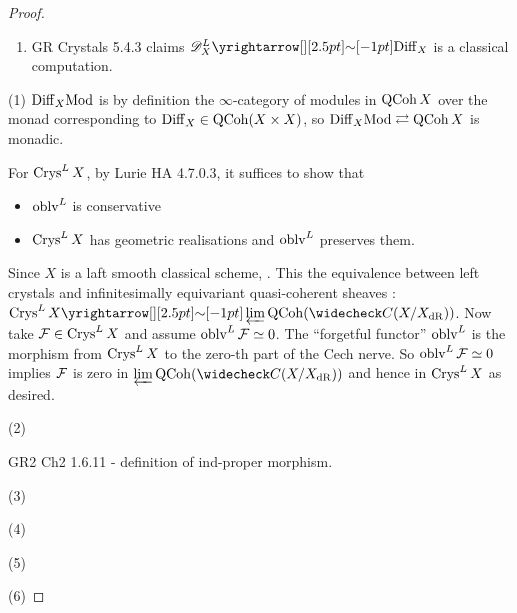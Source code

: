 \documentclass[./main.tex]{subfiles}
\begin{document}
\begin{proof}
\begin{enumerate}
    \item GR Crystals 5.4.3 claims $\s{D}^L_X \map{\sim}{} \DIFF_X$ 
    is a classical computation.

  \end{enumerate}

  (1) $\mathrm{Diff}_X\mathrm{Mod}$ is by definition the $\infty$-category of
  modules in $\mathrm{QCoh}\,X$ over the monad corresponding to 
  $\mathrm{Diff}_X \in \mathrm{QCoh}(X\times X)$,
  so $\mathrm{Diff}_X\mathrm{Mod} \rightleftarrows \mathrm{QCoh}\,X$ is monadic.
  
  For $\mathrm{Crys}^L\,X$,
  by Lurie HA 4.7.0.3, 
  it suffices to show that 
  \begin{itemize}
    \item $\mathrm{oblv}^L$ is conservative
    \item $\mathrm{Crys}^L\,X$ has geometric realisations and $\mathrm{oblv}^L$ preserves them.
  \end{itemize}


  Since $X$ is a laft smooth classical scheme,
  .
  This  the equivalence 
  between left crystals and infinitesimally equivariant quasi-coherent sheaves :
  $\CRYS^L\,X \map{\sim}{} \LIM \QCOH(\check{C}(X / X_\DR))$.
  Now take $\mathcal{F} \in \mathrm{Crys}^L\,X$ and assume $\mathrm{oblv}^L\,\mathcal{F} \simeq 0$.
  The ``forgetful functor'' $\mathrm{oblv}^L$ is the morphism from
  $\mathrm{Crys}^L\,X$ to the zero-th part of the Cech nerve.
  So $\mathrm{oblv}^L\,\mathcal{F} \simeq 0$ implies $\mathcal{F}$ is zero in 
  $\LIM \QCOH(\check{C}(X / X_\DR))$ and hence in $\mathrm{Crys}^L\,X$ as desired. 

  (2) 

  GR2 Ch2 1.6.11 - definition of ind-proper morphism.

  (3)

  (4)

  (5)

  (6)

\end{proof}
\end{document}
